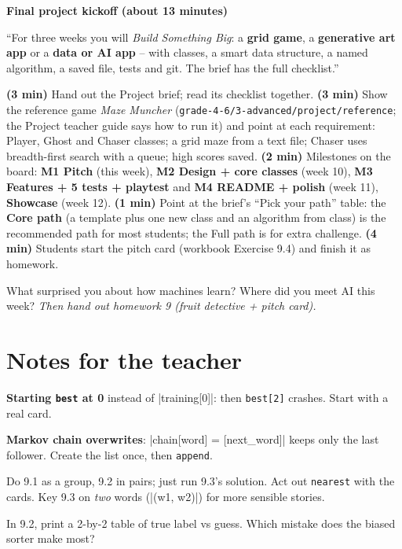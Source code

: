 \textbf{Final project kickoff (about 13 minutes)}
\begin{teacherscript}
\enquote{For three weeks you will \emph{Build Something Big}: a \textbf{grid game}, a \textbf{generative art app} or a \textbf{data or AI app} -- with classes, a smart data structure, a named algorithm, a saved file, tests and git. The brief has the full checklist.}
\end{teacherscript}
\textbf{(3 min)} Hand out the Project brief; read its checklist together. \textbf{(3 min)} Show the reference game \emph{Maze Muncher} (\texttt{grade-4-6/3-advanced/project/reference}; the Project teacher guide says how to run it) and point at each requirement: Player, Ghost and Chaser classes; a grid maze from a text file; Chaser uses breadth-first search with a queue; high scores saved. \textbf{(2 min)} Milestones on the board: \textbf{M1 Pitch} (this week), \textbf{M2 Design + core classes} (week 10), \textbf{M3 Features + 5 tests + playtest} and \textbf{M4 README + polish} (week 11), \textbf{Showcase} (week 12). \textbf{(1 min)} Point at the brief's \enquote{Pick your path} table: the \textbf{Core path} (a template plus one new class and an algorithm from class) is the recommended path for most students; the Full path is for extra challenge. \textbf{(4 min)} Students start the pitch card (workbook Exercise 9.4) and finish it as homework.

\begin{reflection}
What surprised you about how machines learn? Where did you meet AI this week? \emph{Then hand out homework 9 (fruit detective + pitch card).}
\end{reflection}

\section{Notes for the teacher}
\begin{commonmistakes}
  \item \textbf{Starting \texttt{best} at 0} instead of \py|training[0]|: then \texttt{best[2]} crashes. Start with a real card.
  \item \textbf{Markov chain overwrites}: \py|chain[word] = [next_word]| keeps only the last follower. Create the list once, then \texttt{append}.
\end{commonmistakes}

\begin{differentiation}
\supportpath Do 9.1 as a group, 9.2 in pairs; just run 9.3's solution. Act out \texttt{nearest} with the cards.
\extensionpath Key 9.3 on \emph{two} words (\py|(w1, w2)|) for more sensible stories.
\end{differentiation}

\begin{stretchchallenge}
In 9.2, print a 2-by-2 table of true label vs guess. Which mistake does the biased sorter make most?
\end{stretchchallenge}
